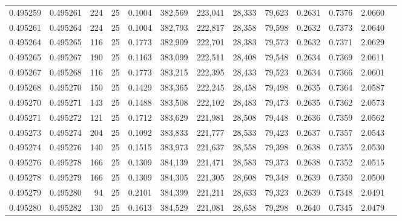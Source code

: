 \begin{tabular}{rrrrrrrrrrrrr}
0.495259 & 0.495261 &   224 &  25 &                                     0.1004 & 382,569 & 223,041 &  28,333 &  79,623 & 0.2631 & 0.7376 & 2.0660 \\
0.495261 & 0.495264 &   224 &  25 &                                     0.1004 & 382,793 & 222,817 &  28,358 &  79,598 & 0.2632 & 0.7373 & 2.0640 \\
0.495264 & 0.495265 &   116 &  25 &                                     0.1773 & 382,909 & 222,701 &  28,383 &  79,573 & 0.2632 & 0.7371 & 2.0629 \\
0.495265 & 0.495267 &   190 &  25 &                                     0.1163 & 383,099 & 222,511 &  28,408 &  79,548 & 0.2634 & 0.7369 & 2.0611 \\
0.495267 & 0.495268 &   116 &  25 &                                     0.1773 & 383,215 & 222,395 &  28,433 &  79,523 & 0.2634 & 0.7366 & 2.0601 \\
0.495268 & 0.495270 &   150 &  25 &                                     0.1429 & 383,365 & 222,245 &  28,458 &  79,498 & 0.2635 & 0.7364 & 2.0587 \\
0.495270 & 0.495271 &   143 &  25 &                                     0.1488 & 383,508 & 222,102 &  28,483 &  79,473 & 0.2635 & 0.7362 & 2.0573 \\
0.495271 & 0.495272 &   121 &  25 &                                     0.1712 & 383,629 & 221,981 &  28,508 &  79,448 & 0.2636 & 0.7359 & 2.0562 \\
0.495273 & 0.495274 &   204 &  25 &                                     0.1092 & 383,833 & 221,777 &  28,533 &  79,423 & 0.2637 & 0.7357 & 2.0543 \\
0.495274 & 0.495276 &   140 &  25 &                                     0.1515 & 383,973 & 221,637 &  28,558 &  79,398 & 0.2638 & 0.7355 & 2.0530 \\
0.495276 & 0.495278 &   166 &  25 &                                     0.1309 & 384,139 & 221,471 &  28,583 &  79,373 & 0.2638 & 0.7352 & 2.0515 \\
0.495278 & 0.495279 &   166 &  25 &                                     0.1309 & 384,305 & 221,305 &  28,608 &  79,348 & 0.2639 & 0.7350 & 2.0500 \\
0.495279 & 0.495280 &    94 &  25 &                                     0.2101 & 384,399 & 221,211 &  28,633 &  79,323 & 0.2639 & 0.7348 & 2.0491 \\
0.495280 & 0.495282 &   130 &  25 &                                     0.1613 & 384,529 & 221,081 &  28,658 &  79,298 & 0.2640 & 0.7345 & 2.0479 \\

\end{tabular}
